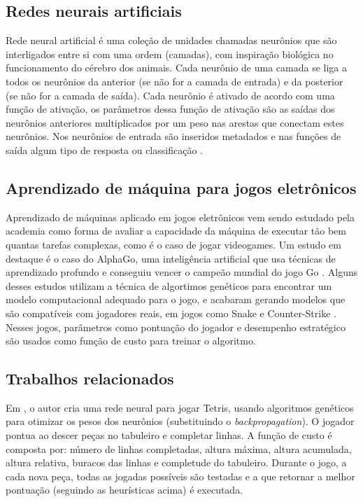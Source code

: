 \documentclass[conference]{IEEEtran}
\begin{document}
\subsection{Redes neurais artificiais}
Rede neural artificial é uma coleção de unidades chamadas neurônios que são interligados entre si com uma ordem (camadas), com inspiração biológica no funcionamento do cérebro dos animais. Cada neurônio de uma camada se liga a todos os neurônios da anterior (se não for a camada de entrada) e da posterior (se não for a camada de saída). Cada neurônio é ativado de acordo com uma função de ativação, os parâmetros dessa função de ativação são as saídas dos neurônios anteriores multiplicados por um peso nas arestas que conectam estes neurônios. Nos neurônios de entrada são inseridos metadados e nas funções de saída algum tipo de resposta ou classificação \cite{b4}.\\

\subsection{Aprendizado de máquina para jogos eletrônicos}
Aprendizado de máquinas aplicado em jogos eletrônicos vem sendo estudado pela academia como forma de avaliar a capacidade da máquina de executar tão bem quantas tarefas complexas, como é o caso de jogar videogames. Um estudo em destaque é o caso do AlphaGo, uma inteligência artificial que usa técnicas de aprendizado profundo e conseguiu vencer o campeão mundial do jogo Go \cite{b5}. Alguns desses estudos utilizam a técnica de algortimos genéticos para encontrar um modelo computacional adequado para o jogo, e acabaram gerando modelos que são compatíveis com jogadores reais, em jogos como Snake \cite{b6} e Counter-Strike \cite{b7}. Nesses jogos, parâmetros como pontuação do jogador e desempenho estratégico são usados como função de custo para treinar o algoritmo.

\subsection{Trabalhos relacionados}
Em \cite{b8}, o autor cria uma rede neural para jogar Tetris, usando algoritmos genéticos para otimizar os pesos dos neurônios (substituindo o \textit{backpropagation}). O jogador pontua ao descer peças no tabuleiro e completar linhas. A função de custo é composta por: número de linhas completadas, altura máxima, altura acumulada, altura relativa, buracos das linhas e completude do tabuleiro. Durante o jogo, a cada nova peça, todas as jogadas possíveis são testadas e a que retornar a melhor pontuação (seguindo as heurísticas acima) é executada.
\end{document}

